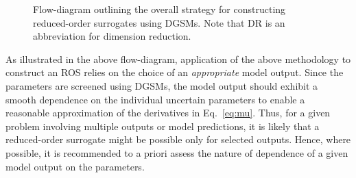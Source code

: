 \begin{figure}[htbp]
\begin{center}
\end{center}

\caption{Flow-diagram outlining the overall strategy for constructing reduced-order surrogates using
DGSMs. Note that DR is an abbreviation for dimension reduction.}
\label{fig:flow}
\end{figure}

As illustrated in the above flow-diagram, application of the above methodology to construct an ROS 
relies on the choice of an \textit{appropriate} model output. Since the parameters are screened
using DGSMs, the model output should exhibit a smooth dependence on the
individual uncertain parameters to enable a reasonable approximation of the derivatives in Eq.~\ref{eq:mu}.
Thus, for a given problem involving multiple outputs or model predictions, it is likely that a reduced-order 
surrogate might be possible only for selected outputs. Hence, where possible, it is recommended to a priori assess the
nature of dependence of a given model output on the parameters.

